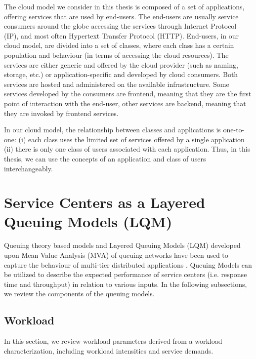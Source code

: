   The cloud model we consider in this thesis is composed of a set of applications, offering services that are used by end-users. The end-users are usually service consumers around the globe accessing the services through Internet Protocol (IP), and most often Hypertext Transfer Protocol (HTTP). End-users, in our cloud model, are divided into a set of classes, where each class has a certain population and behaviour (in terms of accessing the cloud resources).
  The services are either generic and offered by the cloud provider (such as naming, storage, etc.) or application-specific and developed by cloud consumers. Both services are hosted and administered on the available infrastructure. %
 Some services developed by the consumers are frontend, meaning that they are the first point of interaction with the end-user, other services are backend, meaning that they are invoked by frontend services.   
  
     In our cloud model, the relationship between classes and applications is one-to-one:  (i) each class uses the limited set of services offered by a single application (ii) there is only one class of users associated with each application.  
     Thus, in this thesis, we can use the concepts of an application and class of users interchangeably. 
    
\section{Service Centers as a Layered Queuing Models (LQM)}  
\label{sec:layered-queuing-models-introduction}   
Queuing theory based models \cite{petriu_approximate_1994,petriu_approximate_2004,badidi-queuing-2005} and Layered Queuing Models (LQM) \cite{rolia_method_1995,ramesh_multi-layer_1998} developed upon Mean Value Analysis (MVA) of queuing networks have been used to capture the behaviour of multi-tier distributed applications \cite{litoiu_hierarchical_2005, xu_performance_2006,hamoun_ghanbari_tuning,liu_layered_????}. 
Queuing Models can be utilized to describe the expected performance of service centers (i.e. response time and throughput) in relation to various inputs. In the following subsections, we review the components of the queuing models.  

\subsection{Workload} 
\label{sec:workload-background}  
  In this section, we review workload parameters derived from a workload characterization, including workload intensities and service demands.    
 

